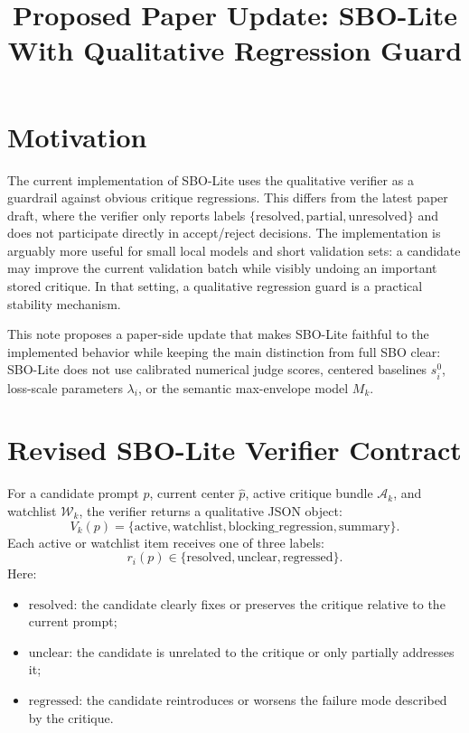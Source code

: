 \documentclass{article}
\title{Proposed Paper Update: SBO-Lite With Qualitative Regression Guard}
\author{}
\date{}
\begin{document}
\maketitle

\section{Motivation}

The current implementation of SBO-Lite uses the qualitative verifier as a
guardrail against obvious critique regressions. This differs from the latest
paper draft, where the verifier only reports labels
\(\{\mathrm{resolved}, \mathrm{partial}, \mathrm{unresolved}\}\) and does not
participate directly in accept/reject decisions. The implementation is arguably
more useful for small local models and short validation sets: a candidate may
improve the current validation batch while visibly undoing an important stored
critique. In that setting, a qualitative regression guard is a practical
stability mechanism.

This note proposes a paper-side update that makes SBO-Lite faithful to the
implemented behavior while keeping the main distinction from full SBO clear:
SBO-Lite does not use calibrated numerical judge scores, centered baselines
\(s_i^0\), loss-scale parameters \(\lambda_i\), or the semantic max-envelope
model \(M_k\).

\section{Revised SBO-Lite Verifier Contract}

For a candidate prompt \(p\), current center \(\hat p\), active critique bundle
\(\mathcal A_k\), and watchlist \(\mathcal W_k\), the verifier returns a
qualitative JSON object:
\[
    V_k(p)
    =
    \{\mathrm{active}, \mathrm{watchlist}, \mathrm{blocking\_regression},
    \mathrm{summary}\}.
\]
Each active or watchlist item receives one of three labels:
\[
    r_i(p)\in
    \{\mathrm{resolved},\mathrm{unclear},\mathrm{regressed}\}.
\]
Here:
\begin{itemize}
    \item \(\mathrm{resolved}\): the candidate clearly fixes or preserves the
    critique relative to the current prompt;
    \item \(\mathrm{unclear}\): the candidate is unrelated to the critique or
    only partially addresses it;
    \item \(\mathrm{regressed}\): the candidate reintroduces or worsens the
    failure mode described by the critique.
\end{itemize}
\end{document}
